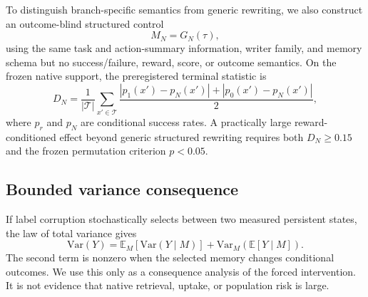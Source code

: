 To distinguish branch-specific semantics from generic rewriting, we also construct an outcome-blind structured control
\begin{equation}
M_N = G_N(\tau),
\end{equation}
using the same task and action-summary information, writer family, and memory schema but no success/failure, reward, score, or outcome semantics. On the frozen native support, the preregistered terminal statistic is
\begin{equation}
D_N=\frac{1}{|\mathcal{T}|}\sum_{x'\in\mathcal{T}}
\frac{|p_1(x')-p_N(x')|+|p_0(x')-p_N(x')|}{2},
\label{eq:neutral-control}
\end{equation}
where $p_r$ and $p_N$ are conditional success rates. A practically large reward-conditioned effect beyond generic structured rewriting requires both $D_N\ge 0.15$ and the frozen permutation criterion $p<0.05$.

\subsection{Bounded variance consequence}
If label corruption stochastically selects between two measured persistent states, the law of total variance gives
\begin{equation}
\mathrm{Var}(Y)=\mathbb{E}_{M}[\mathrm{Var}(Y\mid M)] + \mathrm{Var}_{M}(\mathbb{E}[Y\mid M]).
\end{equation}
The second term is nonzero when the selected memory changes conditional outcomes. We use this only as a consequence analysis of the forced intervention. It is not evidence that native retrieval, uptake, or population risk is large.

